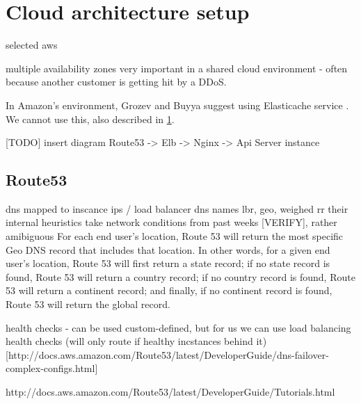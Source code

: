 \documentclass{uvamscse}
\begin{document}
\section{Cloud architecture setup} \label{Cloud architecture setup}

selected aws

multiple availability zones very important in a shared cloud environment - often because another customer is getting hit by a DDoS.\cite{GroBuy}

In Amazon’s environment, Grozev and Buyya suggest using Elasticache service \cite{GroBuy}. We cannot use this, also described in \ref{Cloud architecture setup}.

[TODO] insert diagram
Route53 -> Elb -> Nginx -> Api Server instance

\subsection{Route53}
  dns mapped to inscance ips / load balancer dns names
  lbr, geo, weighed rr
  their internal heuristics take network conditions from past weeks [VERIFY], rather amibiguous
  For each end user’s location, Route 53 will return the most specific Geo DNS record that includes that location. In other words, for a given end user’s location, Route 53 will first return a state record; if no state record is found, Route 53 will return a country record; if no country record is found, Route 53 will return a continent record; and finally, if no continent record is found, Route 53 will return the global record.

  health checks - can be used custom-defined, but for us we can use load balancing health checks (will only route if healthy incstances behind it) [http://docs.aws.amazon.com/Route53/latest/DeveloperGuide/dns-failover-complex-configs.html]

  http://docs.aws.amazon.com/Route53/latest/DeveloperGuide/Tutorials.html
\end{document}
